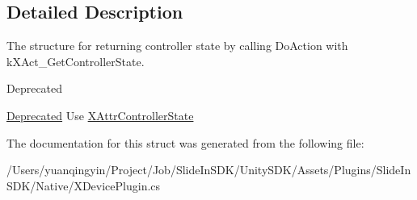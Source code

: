 \subsection{Detailed Description}
The structure for returning controller state by calling Do\+Action with k\+X\+Act\+\_\+\+Get\+Controller\+State. 

\begin{DoxyRefDesc}{Deprecated}
\item[\mbox{\hyperlink{deprecated__deprecated000004}{Deprecated}}]Use \mbox{\hyperlink{struct_ximmerse_1_1_input_system_1_1_x_device_plugin_1_1_x_attr_controller_state}{X\+Attr\+Controller\+State}} \end{DoxyRefDesc}


The documentation for this struct was generated from the following file\+:\begin{DoxyCompactItemize}
\item 
/\+Users/yuanqingyin/\+Project/\+Job/\+Slide\+In\+S\+D\+K/\+Unity\+S\+D\+K/\+Assets/\+Plugins/\+Slide\+In\+S\+D\+K/\+Native/X\+Device\+Plugin.\+cs\end{DoxyCompactItemize}
